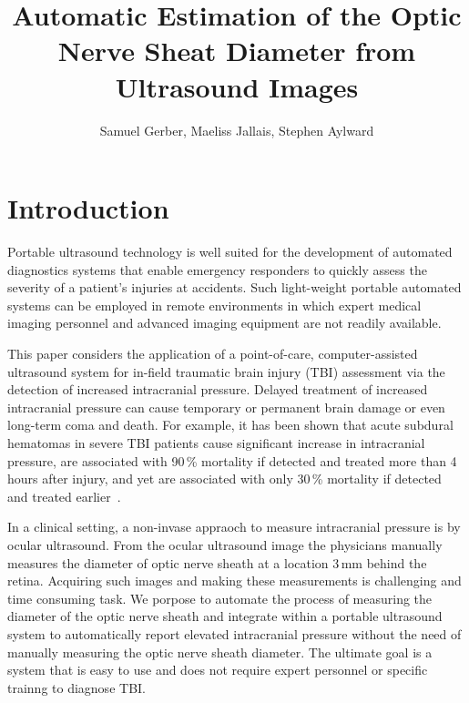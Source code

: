 \documentclass{llncs}
\begin{document}
\title{Automatic Estimation of the Optic Nerve Sheat Diameter from Ultrasound Images}
%
%
\author{
Samuel Gerber,
Maeliss Jallais,
Stephen Aylward
}

%
%
%

\maketitle              %

\begin{abstract}
\end{abstract}
%
\section{Introduction}
Portable ultrasound technology is well suited for the development of automated
diagnostics systems that enable emergency responders to quickly assess the
severity of a patient's injuries at accidents. Such light-weight portable
automated systems can be employed in remote environments in which expert medical
imaging personnel and advanced imaging equipment are not readily available.
 
This paper considers the application of a point-of-care, computer-assisted
ultrasound system for in-field traumatic brain injury (TBI) assessment via the
detection of increased intracranial pressure. Delayed treatment of increased
intracranial pressure can cause temporary or permanent brain damage or even
long-term coma and death. For example, it has been shown that acute subdural
hematomas in severe TBI patients cause significant increase in intracranial
pressure, are associated with 90\,\% mortality if detected and treated more than
4 hours after injury, and yet are associated with only 30\,\% mortality if
detected and treated earlier~\cite{Se1981}.

In a clinical setting, a non-invase appraoch to measure intracranial pressure is
by ocular ultrasound. From the ocular ultrasound image the physicians manually
measures the diameter of optic nerve sheath at a location 3\,mm behind the retina.
Acquiring such images and making these measurements is challenging and time
consuming task. We porpose to automate the process of measuring the diameter of
the optic nerve sheath and integrate within a portable ultrasound system to
automatically report elevated intracranial pressure without the need of manually
measuring the optic nerve sheath diameter. The ultimate goal is a system that is
easy to use and does not require expert personnel or specific trainng to
diagnose TBI.    
\end{document}
